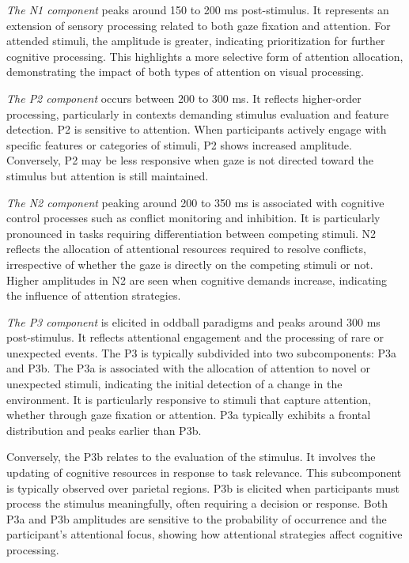 \emph{The N1 component} peaks around 150 to 200 ms post-stimulus.
It represents an extension of sensory processing related to both gaze fixation
and attention.
For attended stimuli, the amplitude is greater, indicating prioritization for
further cognitive processing.
This highlights a more selective form of attention allocation, demonstrating
the impact of both types of attention on visual processing.

\emph{The P2 component} occurs between 200 to 300 ms.
It reflects higher-order processing, particularly in contexts demanding
stimulus evaluation and feature detection.
P2 is sensitive to attention.
When participants actively engage with specific features or categories of
stimuli, P2 shows increased amplitude.
Conversely, P2 may be less responsive when gaze is not directed toward the
stimulus but attention is still maintained.

\emph{The N2 component} peaking around 200 to 350 ms is associated with cognitive
control processes such as conflict monitoring and inhibition.
It is particularly pronounced in tasks requiring differentiation between
competing stimuli.
N2 reflects the allocation of attentional resources required to resolve
conflicts, irrespective of whether the gaze is directly on the competing
stimuli or not.
Higher amplitudes in N2 are seen when cognitive demands increase, indicating
the influence of attention strategies.

\emph{The P3 component} is elicited in oddball paradigms and peaks around 300 ms
post-stimulus.
It reflects attentional engagement and the processing of rare or unexpected
events.
The P3 is typically subdivided into two subcomponents: P3a and P3b.
The P3a is associated with the allocation of attention to novel or unexpected
stimuli, indicating the initial detection of a change in the environment.
It is particularly responsive to stimuli that capture attention, whether
through gaze fixation or attention.
P3a typically exhibits a frontal distribution and peaks earlier than P3b.

Conversely, the P3b relates to the evaluation of the stimulus.
It involves the updating of cognitive resources in response to task relevance.
This subcomponent is typically observed over parietal regions.
P3b is elicited when participants must process the stimulus meaningfully,
often requiring a decision or response.
Both P3a and P3b amplitudes are sensitive to the probability of occurrence
and the participant's attentional focus, showing how attentional strategies
affect cognitive processing.

